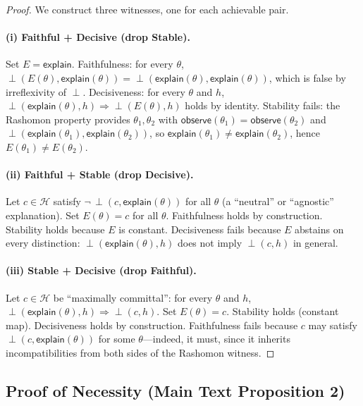 \documentclass[11pt]{article}
\newcommand{\sH}{\mathcal{H}}
\newcommand{\incomp}{\perp}
\begin{document}
\begin{proof}
We construct three witnesses, one for each achievable pair.

\paragraph{(i) Faithful + Decisive (drop Stable).}
Set $E = \mathsf{explain}$. Faithfulness: for every $\theta$,
$\incomp(E(\theta), \mathsf{explain}(\theta)) =
\incomp(\mathsf{explain}(\theta), \mathsf{explain}(\theta))$, which is
false by irreflexivity of $\incomp$. Decisiveness: for every $\theta$ and
$h$, $\incomp(\mathsf{explain}(\theta), h) \Rightarrow
\incomp(E(\theta), h)$ holds by identity. Stability fails: the Rashomon
property provides $\theta_1, \theta_2$ with
$\mathsf{observe}(\theta_1) = \mathsf{observe}(\theta_2)$ and
$\incomp(\mathsf{explain}(\theta_1), \mathsf{explain}(\theta_2))$, so
$\mathsf{explain}(\theta_1) \neq \mathsf{explain}(\theta_2)$, hence
$E(\theta_1) \neq E(\theta_2)$.

\paragraph{(ii) Faithful + Stable (drop Decisive).}
Let $c \in \sH$ satisfy $\neg\,\incomp(c, \mathsf{explain}(\theta))$ for
all $\theta$ (a ``neutral'' or ``agnostic'' explanation). Set
$E(\theta) = c$ for all $\theta$. Faithfulness holds by construction.
Stability holds because $E$ is constant. Decisiveness fails because $E$
abstains on every distinction: $\incomp(\mathsf{explain}(\theta), h)$
does not imply $\incomp(c, h)$ in general.

\paragraph{(iii) Stable + Decisive (drop Faithful).}
Let $c \in \sH$ be ``maximally committal'': for every $\theta$ and $h$,
$\incomp(\mathsf{explain}(\theta), h) \Rightarrow \incomp(c, h)$. Set
$E(\theta) = c$. Stability holds (constant map). Decisiveness holds by
construction. Faithfulness fails because $c$ may satisfy
$\incomp(c, \mathsf{explain}(\theta))$ for some $\theta$---indeed, it
must, since it inherits incompatibilities from both sides of the Rashomon
witness.
\end{proof}

\subsection{Proof of Necessity (Main Text Proposition 2)}
\end{document}
